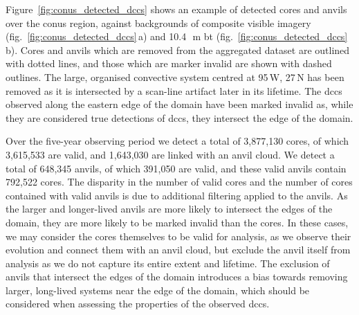 Figure~\ref{fig:conus_detected_dccs} shows an example of detected cores and anvils over the \acrshort{conus} region, against backgrounds of composite visible imagery (fig.~\ref{fig:conus_detected_dccs}\,a) and 10.4\,\unit{\mu m} \acrshort{bt} (fig.~\ref{fig:conus_detected_dccs}\,b).
Cores and anvils which are removed from the aggregated dataset are outlined with dotted lines, and those which are marker invalid are shown with dashed outlines.
The large, organised convective system centred at 95\,\textdegree W, 27\,\textdegree N has been removed as it is intersected by a scan-line artifact later in its lifetime.
The \acrshort{dcc}s observed along the eastern edge of the domain have been marked invalid as, while they are considered true detections of \acrshort{dcc}s, they intersect the edge of the domain.

Over the five-year observing period we detect a total of 3,877,130 cores, of which 3,615,533 are valid, and 1,643,030 are linked with an anvil cloud. 
We detect a total of 648,345 anvils, of which 391,050 are valid, and these valid anvils contain 792,522 cores.
The disparity in the number of valid cores and the number of cores contained with valid anvils is due to additional filtering applied to the anvils.
As the larger and longer-lived anvils are more likely to intersect the edges of the domain, they are more likely to be marked invalid than the cores.
In these cases, we may consider the cores themselves to be valid for analysis, as we observe their evolution and connect them with an anvil cloud, but exclude the anvil itself from analysis as we do not capture its entire extent and lifetime.
The exclusion of anvils that intersect the edges of the domain introduces a bias towards removing larger, long-lived systems near the edge of the domain, which should be considered when assessing the properties of the observed \acrshort{dcc}s.






